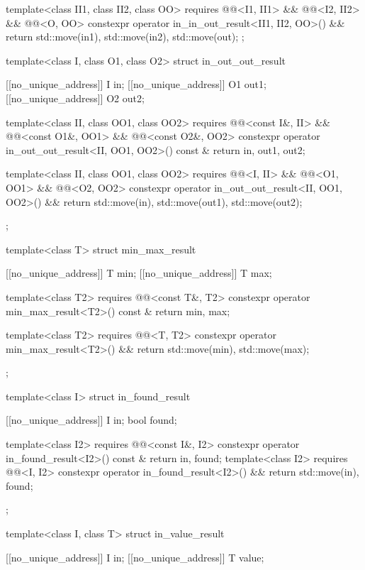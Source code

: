 \begin{codeblock}
{{    template<class II1, class II2, class OO>
      requires @@<I1, II1> &&
               @@<I2, II2> &&
               @@<O, OO>
    constexpr operator in_in_out_result<II1, II2, OO>() && {
      return {std::move(in1), std::move(in2), std::move(out)};
    }
  };

  template<class I, class O1, class O2>
  struct in_out_out_result {
    [[no_unique_address]] I  in;
    [[no_unique_address]] O1 out1;
    [[no_unique_address]] O2 out2;

    template<class II, class OO1, class OO2>
      requires @@<const I&, II> &&
               @@<const O1&, OO1> &&
               @@<const O2&, OO2>
    constexpr operator in_out_out_result<II, OO1, OO2>() const & {
      return {in, out1, out2};
    }

    template<class II, class OO1, class OO2>
      requires @@<I, II> &&
               @@<O1, OO1> &&
               @@<O2, OO2>
    constexpr operator in_out_out_result<II, OO1, OO2>() && {
      return {std::move(in), std::move(out1), std::move(out2)};
    }
  };

  template<class T>
  struct min_max_result {
    [[no_unique_address]] T min;
    [[no_unique_address]] T max;

    template<class T2>
      requires @@<const T&, T2>
    constexpr operator min_max_result<T2>() const & {
      return {min, max};
    }

    template<class T2>
      requires @@<T, T2>
    constexpr operator min_max_result<T2>() && {
      return {std::move(min), std::move(max)};
    }
  };

  template<class I>
  struct in_found_result {
    [[no_unique_address]] I in;
    bool found;

    template<class I2>
      requires @@<const I&, I2>
    constexpr operator in_found_result<I2>() const & {
      return {in, found};
    }
    template<class I2>
      requires @@<I, I2>
    constexpr operator in_found_result<I2>() && {
      return {std::move(in), found};
    }
  };

  template<class I, class T>
  struct in_value_result {
    [[no_unique_address]] I in;
    [[no_unique_address]] T value;

}}
\end{codeblock}
